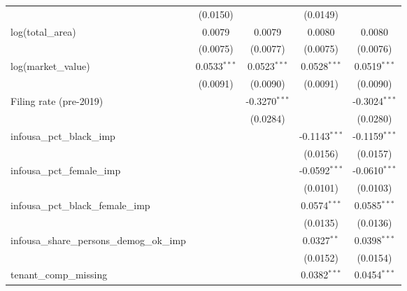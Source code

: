 \documentclass[
  11pt,
]{article}
\begin{document}
\begin{adjustbox}{max width=\textwidth}
\begin{tabular}{lcccc}
                                                           & (0.0150)        &                 & (0.0149)        &   \\   
   log(total\_area)                                        & 0.0079          & 0.0079          & 0.0080          & 0.0080\\   
                                                           & (0.0075)        & (0.0077)        & (0.0075)        & (0.0076)\\   
   log(market\_value)                                      & 0.0533$^{***}$  & 0.0523$^{***}$  & 0.0528$^{***}$  & 0.0519$^{***}$\\   
                                                           & (0.0091)        & (0.0090)        & (0.0091)        & (0.0090)\\   
   Filing rate (pre-2019)                                  &                 & -0.3270$^{***}$ &                 & -0.3024$^{***}$\\   
                                                           &                 & (0.0284)        &                 & (0.0280)\\   
   infousa\_pct\_black\_imp                                &                 &                 & -0.1143$^{***}$ & -0.1159$^{***}$\\   
                                                           &                 &                 & (0.0156)        & (0.0157)\\   
   infousa\_pct\_female\_imp                               &                 &                 & -0.0592$^{***}$ & -0.0610$^{***}$\\   
                                                           &                 &                 & (0.0101)        & (0.0103)\\   
   infousa\_pct\_black\_female\_imp                        &                 &                 & 0.0574$^{***}$  & 0.0585$^{***}$\\   
                                                           &                 &                 & (0.0135)        & (0.0136)\\   
   infousa\_share\_persons\_demog\_ok\_imp                 &                 &                 & 0.0327$^{**}$   & 0.0398$^{***}$\\   
                                                           &                 &                 & (0.0152)        & (0.0154)\\   
   tenant\_comp\_missing                                   &                 &                 & 0.0382$^{***}$  & 0.0454$^{***}$\\   

\end{tabular}
\end{adjustbox}
\end{document}
